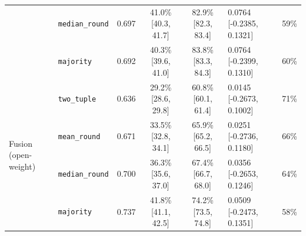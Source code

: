 \begin{table}[htbp]
\begin{tabular}{llccclr}
   & \texttt{median\_round} & 0.697 & 41.0\% \tiny[40.3, 41.7] & 82.9\% \tiny[82.3, 83.4] & 0.0764 [-0.2385, 0.1321] & 59\% \\
   & \texttt{majority} & 0.692 & 40.3\% \tiny[39.6, 41.0] & 83.8\% \tiny[83.3, 84.3] & 0.0764 [-0.2399, 0.1310] & 60\% \\
\midrule
  \multirow{4}{*}{Fusion (open-weight)} & \texttt{two\_tuple} & 0.636 & 29.2\% \tiny[28.6, 29.8] & 60.8\% \tiny[60.1, 61.4] & 0.0145 [-0.2673, 0.1002] & 71\% \\
   & \texttt{mean\_round} & 0.671 & 33.5\% \tiny[32.8, 34.1] & 65.9\% \tiny[65.2, 66.5] & 0.0251 [-0.2736, 0.1180] & 66\% \\
   & \texttt{median\_round} & 0.700 & 36.3\% \tiny[35.6, 37.0] & 67.4\% \tiny[66.7, 68.0] & 0.0356 [-0.2653, 0.1246] & 64\% \\
   & \texttt{majority} & 0.737 & 41.8\% \tiny[41.1, 42.5] & 74.2\% \tiny[73.5, 74.8] & 0.0509 [-0.2473, 0.1351] & 58\% \\
\bottomrule
\end{tabular}
\end{table}
